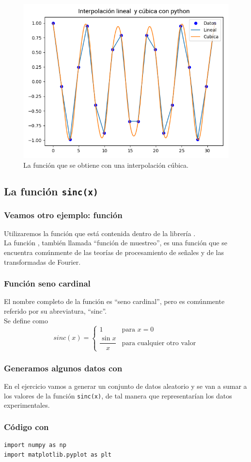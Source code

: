 {\begin{frame}
\begin{figure}
\hspace*{-0.2cm}\includegraphics[scale=0.5]{Imagenes/interpolacion_03b}
\caption{La función que se obtiene con una interpolación cúbica.}
\end{figure}
\end{frame}
\subsection{La función \texttt{sinc(x)}}
\begin{frame}
\frametitle{Veamos otro ejemplo: función }
Utilizaremos la función  que está contenida dentro de la librería .
\\
\bigskip
La función , también llamada \enquote{función de muestreo}, es una función que se encuentra comúnmente de las teorías de procesamiento de señales y de las transformadas de Fourier.
\end{frame}
\begin{frame}
\frametitle{Función seno cardinal}
El nombre completo de la función es \enquote{seno cardinal}, pero es comúnmente referido por su abreviatura, \enquote{sinc}.
\\
\bigskip
Se define como
\[ sinc(x) = \begin{cases}
1 & \mbox{para } x = 0 \\
\dfrac{\sin x}{x} & \mbox{para cualquier otro valor} \end{cases} \]
\end{frame}
\begin{frame}[fragile]
\frametitle{Generamos algunos datos con }
En el ejercicio vamos a generar un conjunto de datos aleatorio y se van a sumar a los valores de la función \texttt{sinc(x)}, de tal manera que representarían los datos experimentales.
\end{frame}
\begin{frame}
\frametitle{Código con \python}
\begin{lstlisting}[caption= Datos iniciales para la comparación, style= FormattedNumber, basicstyle=\linespread{0.9}\ttfamily=\small, columns=fullflexible]
import numpy as np
import matplotlib.pyplot as plt


\end{lstlisting}
\end{frame}}
